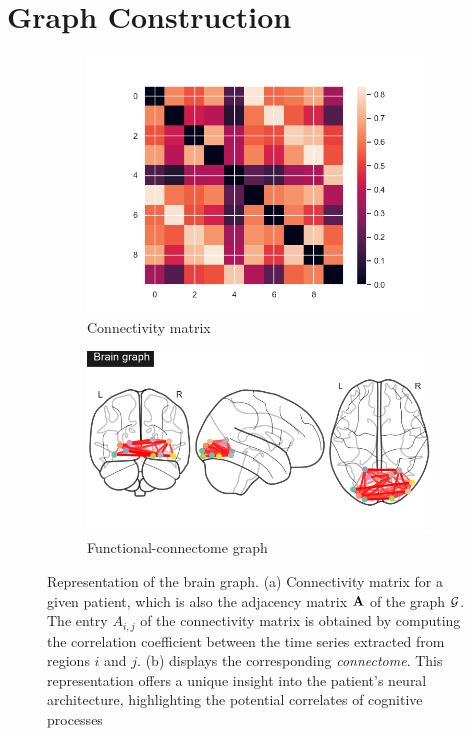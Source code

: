 \section{Graph Construction}

\begin{figure}[H]
\centering
    \begin{subfigure}{\textwidth}
        \centering
        \includegraphics[height=.35\textheight]{img/connectivity_matrix.png}
        \caption{Connectivity matrix}
        \label{fig:connectivity}
    \end{subfigure}
    \begin{subfigure}{\textwidth}
        \centering
        \includegraphics{img/brain_graph.png}
        \caption{Functional-connectome graph}
        \label{ex_graph}
    \end{subfigure}
    \caption{Representation of the brain graph. (a) Connectivity matrix for a given patient, which is also the adjacency matrix $\mathbf{A}$ of the graph $\mathcal{G}$. The entry $A_{i,j}$ of the connectivity matrix is obtained by computing the correlation coefficient between the time series extracted from regions $i$ and $j$. (b) displays the corresponding \textit{connectome}. This representation offers a unique insight into the patient’s
neural architecture, highlighting the potential correlates of cognitive processes}
    \label{fig:brain_graph}
\end{figure}

